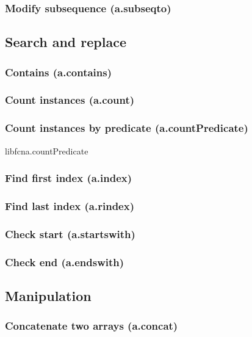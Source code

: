 \documentclass{article}
\theoremstyle{definition}
\begin{document}
\subsubsection{Modify subsequence (a.subseqto)}

\subsection{Search and replace}

\subsubsection{Contains (a.contains)}

\subsubsection{Count instances (a.count)}

\subsubsection{Count instances by predicate (a.countPredicate)}
libfcn{a.countPredicate}

\subsubsection{Find first index (a.index)}

\subsubsection{Find last index (a.rindex)}

\subsubsection{Check start (a.startswith)}

\subsubsection{Check end (a.endswith)}

\subsection{Manipulation}

\subsubsection{Concatenate two arrays (a.concat)}
\end{document}
